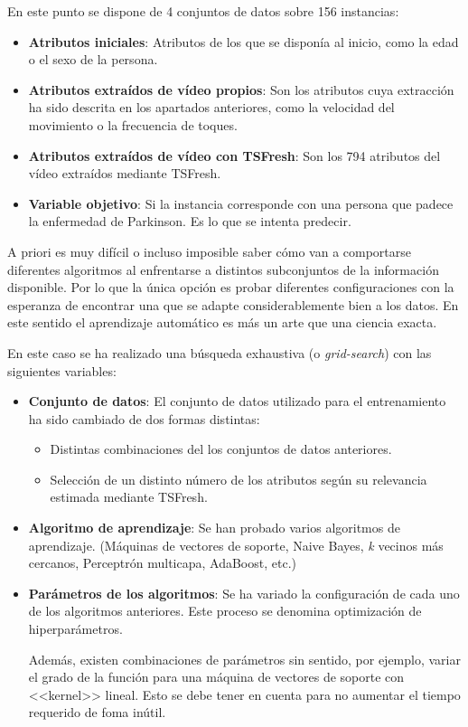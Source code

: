En este punto se dispone de 4 conjuntos de datos sobre 156 instancias:

\begin{itemize}
    \item \textbf{Atributos iniciales}: Atributos de los que se disponía al
    inicio, como la edad o el sexo de la persona.
    \item \textbf{Atributos extraídos de vídeo propios}: Son los atributos cuya
    extracción ha sido descrita en los apartados anteriores, como la velocidad
    del movimiento o la frecuencia de toques.
    \item \textbf{Atributos extraídos de vídeo con TSFresh}: Son los 794
    atributos del vídeo extraídos mediante TSFresh.
    \item \textbf{Variable objetivo}: Si la instancia corresponde con una
    persona que padece la enfermedad de Parkinson. Es lo que se intenta predecir.
\end{itemize}

A priori es muy difícil o incluso imposible saber cómo van a comportarse
diferentes algoritmos al enfrentarse a distintos subconjuntos de la información
disponible. Por lo que la única opción es probar diferentes configuraciones con
la esperanza de encontrar una que se adapte considerablemente bien a los datos.
En este sentido el aprendizaje automático es más un arte que una ciencia exacta.

En este caso se ha realizado una búsqueda exhaustiva (o \textit{grid-search})
con las siguientes variables:

\begin{itemize}
    \item \textbf{Conjunto de datos}: El conjunto de datos utilizado para el
    entrenamiento ha sido cambiado de dos formas distintas:
    \begin{itemize}
        \item Distintas combinaciones del los conjuntos de datos anteriores.
        \item Selección de un distinto número de los atributos según su
        relevancia estimada mediante TSFresh.
    \end{itemize}
    \item \textbf{Algoritmo de aprendizaje}: Se han probado varios algoritmos de
    aprendizaje. (Máquinas de vectores de soporte, Naive Bayes, \textit{k}
    vecinos más cercanos, Perceptrón multicapa, AdaBoost, etc.)
    \item \textbf{Parámetros de los algoritmos}: Se ha variado la configuración
    de cada uno de los algoritmos anteriores. Este proceso se denomina
    optimización de hiperparámetros.
    
    Además, existen combinaciones de parámetros sin sentido, por ejemplo, variar
    el grado de la función para una máquina de vectores de soporte con
    <<kernel>> lineal. Esto se debe tener en cuenta para no aumentar el tiempo
    requerido de foma inútil.
\end{itemize}

